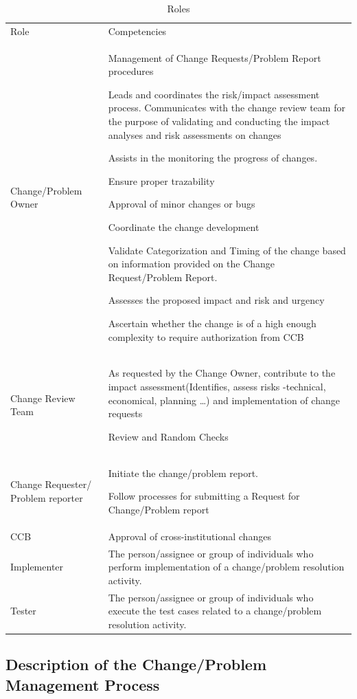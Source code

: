 \documentclass{template/openetcs_article}
\begin{document}
\begin{table}[H]
\begin{tabular}{|m{}|m{10cm}|}
\hline
\rowcolor{myblue}
\multicolumn{2}{|c|}{Roles} \\\hline
\rowcolor{lightgray}
Role &
Competencies \\\hline
Change/Problem Owner &
Management of Change Requests/Problem Report procedures

Leads and coordinates the risk/impact assessment process. Communicates with the change review team for the purpose of validating and conducting the impact analyses and risk assessments on changes

Assists in the monitoring the progress of changes.

Ensure proper trazability 

Approval of minor changes or bugs

Coordinate the change development

Validate Categorization and Timing of the change based on information provided on the Change Request/Problem Report.

Assesses the proposed impact and risk and urgency

Ascertain whether the change is of a high enough complexity to require authorization from CCB\\\hline
Change Review Team &
As requested by the Change Owner, contribute to the impact assessment(Identifies, assess risks -technical, economical, planning {\dots}) and implementation of change requests

Review and Random Checks \\\hline
Change Requester/ Problem reporter &
Initiate the change/problem report.

Follow processes for submitting a Request for Change/Problem report\\\hline
CCB &
Approval of cross-institutional changes \\\hline
Implementer &
The person/assignee or group of individuals who perform
implementation of a change/problem resolution activity.\\\hline
Tester &
The person/assignee or group of individuals who execute
the test cases related to a change/problem resolution activity.\\\hline
\end{tabular}
\caption{Roles}
\end{table}


\subsection{Description of the Change/Problem Management Process}
\end{document}
